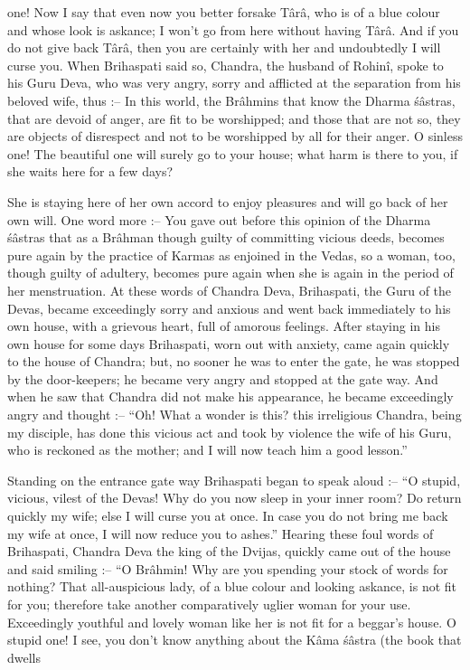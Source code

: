 one! Now I say that even now you better forsake T\^ar\^a, who is of a blue colour and whose look is askance; I won't go from here without having T\^ar\^a. And if you do not give back T\^ar\^a, then you are certainly with her and undoubtedly I will curse you. When Brihaspati said so, Chandra, the husband of Rohin\^i, spoke to his Guru Deva, who was very angry, sorry and afflicted at the separation from his beloved wife, thus :-- In this world, the Br\^ahmins that know the Dharma \'s\^astras, that are devoid of anger, are fit to be worshipped; and those that are not so, they are objects of disrespect and not to be worshipped by all for their anger. O sinless one! The beautiful one will surely go to your house; what harm is there to you, if she waits here for a few days?

She is staying here of her own accord to enjoy pleasures and will go back of her own will. One word more :-- You gave out before this opinion of the Dharma \'s\^astras that as a Br\^ahman though guilty of committing vicious deeds, becomes pure again by the practice of Karmas as enjoined in the Vedas, so a woman, too, though guilty of adultery, becomes pure again when she is again in the period of her menstruation. At these words of Chandra Deva, Brihaspati, the Guru of the Devas, became exceedingly sorry and anxious and went back immediately to his own house, with a grievous heart, full of amorous feelings. After staying in his own house for some days Brihaspati, worn out with anxiety, came again quickly to the house of Chandra; but, no sooner he was to enter the gate, he was stopped by the door-keepers; he became very angry and stopped at the gate way. And when he saw that Chandra did not make his appearance, he became exceedingly angry and thought :--  ``Oh! What a wonder is this? this irreligious Chandra, being my disciple, has done this vicious act and took by violence the wife of his Guru, who is reckoned as the mother; and I will now teach him a good lesson.''

Standing on the entrance gate way Brihaspati began to speak aloud :-- ``O stupid, vicious, vilest of the Devas! Why do you now sleep in your inner room? Do return quickly my wife; else I will curse you at once. In case you do not bring me back my wife at once, I will now reduce you to ashes.'' Hearing these foul words of Brihaspati, Chandra Deva the king of the Dvijas, quickly came out of the house and said smiling :-- ``O Br\^ahmin! Why are you spending your stock of words for nothing? That all-auspicious lady, of a blue colour and looking askance, is not fit for you; therefore take another comparatively uglier woman for your use. Exceedingly youthful and lovely woman like her is not fit for a beggar's house. O stupid one! I see, you don't know anything about the K\^ama \'s\^astra (the book that dwells

